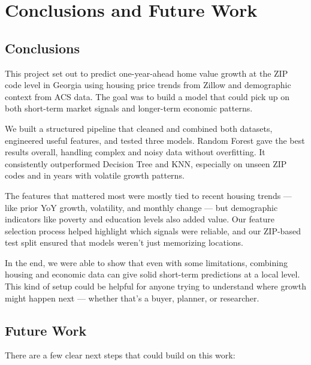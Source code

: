 \chapter{Conclusions and Future Work}
\label{ch:con}

\section{Conclusions}

This project set out to predict one-year-ahead home value growth at the ZIP code level in Georgia using housing price trends from Zillow and demographic context from ACS data. The goal was to build a model that could pick up on both short-term market signals and longer-term economic patterns.

We built a structured pipeline that cleaned and combined both datasets, engineered useful features, and tested three models. Random Forest gave the best results overall, handling complex and noisy data without overfitting. It consistently outperformed Decision Tree and KNN, especially on unseen ZIP codes and in years with volatile growth patterns.

The features that mattered most were mostly tied to recent housing trends — like prior YoY growth, volatility, and monthly change — but demographic indicators like poverty and education levels also added value. Our feature selection process helped highlight which signals were reliable, and our ZIP-based test split ensured that models weren’t just memorizing locations.

In the end, we were able to show that even with some limitations, combining housing and economic data can give solid short-term predictions at a local level. This kind of setup could be helpful for anyone trying to understand where growth might happen next — whether that’s a buyer, planner, or researcher.

\section{Future Work}

There are a few clear next steps that could build on this work:


